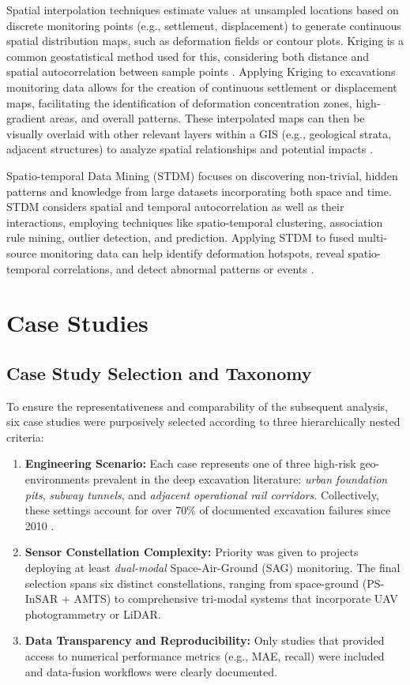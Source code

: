 \documentclass[preprint,11pt,authoryear,3p]{elsarticle}
\begin{document}
Spatial interpolation techniques estimate values at unsampled locations based on discrete monitoring points (e.g., settlement, displacement) to generate continuous spatial distribution maps, such as deformation fields or contour plots. Kriging is a common geostatistical method used for this, considering both distance and spatial autocorrelation between sample points \citep{TERRANOVA2015105}. Applying Kriging to excavations monitoring data allows for the creation of continuous settlement or displacement maps, facilitating the identification of deformation concentration zones, high-gradient areas, and overall patterns. These interpolated maps can then be visually overlaid with other relevant layers within a GIS (e.g., geological strata, adjacent structures) to analyze spatial relationships and potential impacts \citep{Spinetti18082019}.

Spatio-temporal Data Mining (STDM) focuses on discovering non-trivial, hidden patterns and knowledge from large datasets incorporating both space and time. STDM considers spatial and temporal autocorrelation as well as their interactions, employing techniques like spatio-temporal clustering, association rule mining, outlier detection, and prediction. Applying STDM to fused multi-source monitoring data can help identify deformation hotspots, reveal spatio-temporal correlations, and detect abnormal patterns or events \citep{FESTA20221}.

\section{Case Studies}

\subsection{Case Study Selection and Taxonomy}
\label{subsec:case_selection}

To ensure the representativeness and comparability of the subsequent analysis, six case studies were purposively selected according to three hierarchically nested criteria:

\begin{enumerate}
    \item \textbf{Engineering Scenario:} Each case represents one of three high-risk geo-environments prevalent in the deep excavation literature: \emph{urban foundation pits}, \emph{subway tunnels}, and \emph{adjacent operational rail corridors}. Collectively, these settings account for over 70\% of documented excavation failures since 2010 \citep{Tan2023Failures,JIANG2022103509}.
    \item \textbf{Sensor Constellation Complexity:} Priority was given to projects deploying at least \emph{dual-modal} Space-Air-Ground (SAG) monitoring. The final selection spans six distinct constellations, ranging from space-ground (PS-InSAR + AMTS) to comprehensive tri-modal systems that incorporate UAV photogrammetry or LiDAR.
    \item \textbf{Data Transparency and Reproducibility:} Only studies that provided access to numerical performance metrics (e.g., MAE, recall) were included and data-fusion workflows were clearly documented. 
\end{enumerate}
\end{document}
